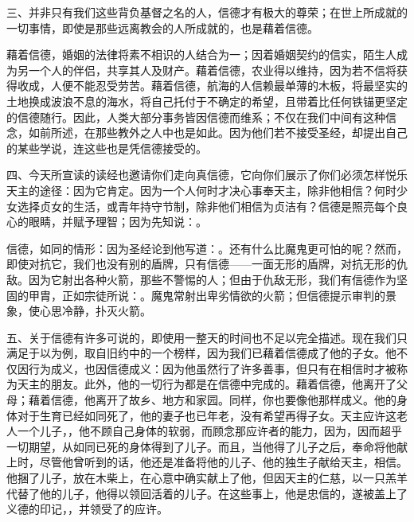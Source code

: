 三、并非只有我们这些背负基督之名的人，信德才有极大的尊荣；在世上所成就的一切事情，即使是那些远离教会的人所成就的，也是藉着信德。\par

藉着信德，婚姻的法律将素不相识的人结合为一；因着婚姻契约的信实，陌生人成为另一个人的伴侣，共享其人及财产。藉着信德，农业得以维持，因为若不信将获得收成，人便不能忍受劳苦。藉着信德，航海的人信赖最单薄的木板，将最坚实的土地换成波浪不息的海水，将自己托付于不确定的希望，且带着比任何铁锚更坚定的信德随行。因此，人类大部分事务皆因信德而维系；不仅在我们中间有这种信念，如前所述，在那些教外之人中也是如此。因为他们若不接受圣经，却提出自己的某些学说，连这些也是凭信德接受的。\par

四、今天所宣读的读经也邀请你们走向真信德，它向你们展示了你们必须怎样悦乐天主的途径：因为它肯定。因为一个人何时才决心事奉天主，除非他相信？何时少女选择贞女的生活，或青年持守节制，除非他们相信为贞洁有？信德是照亮每个良心的眼睛，并赋予理智；因为先知说：。\par

信德，如同的情形：因为圣经论到他写道：。还有什么比魔鬼更可怕的呢？然而，即使对抗它，我们也没有别的盾牌，只有信德——一面无形的盾牌，对抗无形的仇敌。因为它射出各种火箭，那些不警惕的人；但由于仇敌无形，我们有信德作为坚固的甲胄，正如宗徒所说：。魔鬼常射出卑劣情欲的火箭；但信德提示审判的景象，使心思冷静，扑灭火箭。\par

五、关于信德有许多可说的，即使用一整天的时间也不足以完全描述。现在我们只满足于以为例，取自旧约中的一个榜样，因为我们已藉着信德成了他的子女。他不仅因行为成义，也因信德成义：因为他虽然行了许多善事，但只有在相信时才被称为天主的朋友。此外，他的一切行为都是在信德中完成的。藉着信德，他离开了父母；藉着信德，他离开了故乡、地方和家园。同样，你也要像他那样成义。他的身体对于生育已经如同死了，他的妻子也已年老，没有希望再得子女。天主应许这老人一个儿子，，他不顾自己身体的软弱，而顾念那应许者的能力，因为，因而超乎一切期望，从如同已死的身体得到了儿子。而且，当他得了儿子之后，奉命将他献上时，尽管他曾听到的话，他还是准备将他的儿子、他的独生子献给天主，相信。他捆了儿子，放在木柴上，在心意中确实献上了他，但因天主的仁慈，以一只羔羊代替了他的儿子，他得以领回活着的儿子。在这些事上，他是忠信的，遂被盖上了义德的印记，，并领受了的应许。\par

